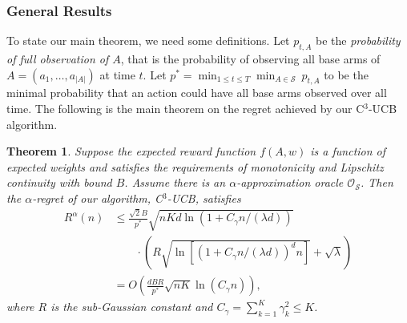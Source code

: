 \documentclass{article}
\newcommand{\cO}{\mathcal{O}}
\newcommand{\cS}{\mathcal{S}}
\newcommand{\abs}[1]{\left| #1 \right|}
\newtheorem{theorem}{Theorem}[section]
\begin{document}
\subsubsection{General Results}

To state our main theorem, we need some definitions. Let $p_{t, A}$ be the {\em probability of full observation of $A$}, that is the probability of observing all base arms of $A = (a_1, \ldots, a_{\abs{A}})$ at time $t$. Let $p^* = \min_{1 \leq t \leq T} \min_{A \in \cS} ~ p_{t, A}$ to be the minimal probability that an action could have all base arms observed over all time. The following is the main theorem on the regret achieved by our C$^3$-UCB algorithm.

\begin{theorem} %
	\label{thm:main}
	Suppose the expected reward function $f(A, w)$ is a function of expected weights and satisfies the requirements of monotonicity and Lipschitz continuity with bound $B$. Assume there is an $\alpha$-approximation oracle $\cO_{\cS}$. Then the $\alpha$-regret of our algorithm, C$^3$-UCB, satisfies
	\begin{align}
		R^{\alpha}(n) &\le \frac{\sqrt{2}B}{p^*} \sqrt{nKd\ln(1 + C_\gamma n/(\lambda d))}  \nonumber \\
		&\qquad \cdot \left(R\sqrt{\ln \left[(1 + C_\gamma n/(\lambda d))^d n \right] } + \sqrt{\lambda}\right) \nonumber \\
		&=O\left(\frac{dBR}{p^*} \sqrt{nK} \ln(C_\gamma n) \right),
	\end{align}
	where $R$ is the sub-Gaussian constant and $C_{\gamma} = \sum_{k=1}^K \gamma_k^2 \leq K$.
\end{theorem}
\end{document}
